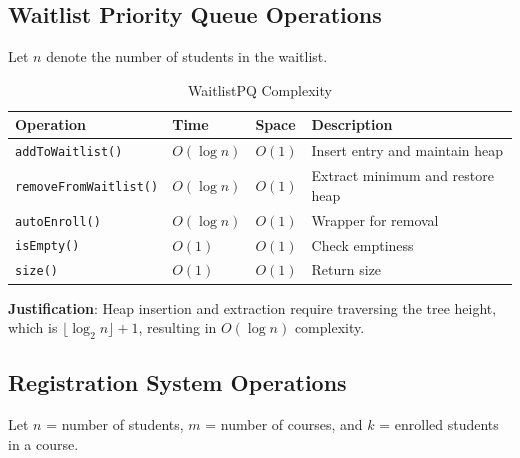 \documentclass[12pt,a4paper]{article}
\begin{document}
\subsection{Waitlist Priority Queue Operations}

Let $n$ denote the number of students in the waitlist.

\begin{table}[h]
\centering
\begin{tabular}{@{}llll@{}}
\toprule
\textbf{Operation} & \textbf{Time} & \textbf{Space} & \textbf{Description} \\
\midrule
\texttt{addToWaitlist()} & $O(\log n)$ & $O(1)$ & Insert entry and maintain heap \\
\texttt{removeFromWaitlist()} & $O(\log n)$ & $O(1)$ & Extract minimum and restore heap \\
\texttt{autoEnroll()} & $O(\log n)$ & $O(1)$ & Wrapper for removal \\
\texttt{isEmpty()} & $O(1)$ & $O(1)$ & Check emptiness \\
\texttt{size()} & $O(1)$ & $O(1)$ & Return size \\
\bottomrule
\end{tabular}
\caption{WaitlistPQ Complexity}
\end{table}

\textbf{Justification}: Heap insertion and extraction require traversing the tree height, which is $\lfloor \log_2 n \rfloor + 1$, resulting in $O(\log n)$ complexity.

\subsection{Registration System Operations}

Let $n$ = number of students, $m$ = number of courses, and $k$ = enrolled students in a course.
\end{document}

